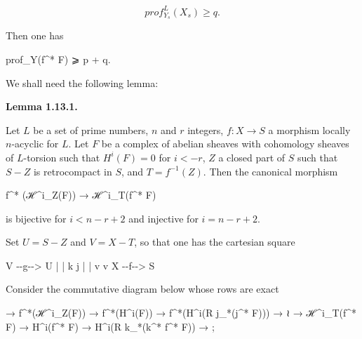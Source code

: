 \documentclass[
  11pt,
  a4paper,
]{book}
\newenvironment{Shaded}{}{}
\newcommand{\NormalTok}[1]{#1}
\begin{document}
\[ prof^{L}_{Y_{s}}(X_{s}) \geqslant q. \]

Then one has

\begin{Shaded}
\begin{Highlighting}[]
\NormalTok{prof\_Y(f\^{}* F) ⩾ p + q.}
\end{Highlighting}
\end{Shaded}

We shall need the following lemma:

\textbf{Lemma 1.13.1.}

Let \(L\) be a set of prime numbers, \(n\) and \(r\) integers,
\(f : X \to S\) a morphism locally \(n\)-acyclic for \(L\). Let \(F\) be
a complex of abelian sheaves with cohomology sheaves of \(L\)-torsion
such that \(H^{i}(F) = 0\) for \(i < -r\), \(Z\) a closed part of \(S\)
such that \(S - Z\) is retrocompact in \(S\), and \(T = f^{-1}(Z)\).
Then the canonical morphism

\begin{Shaded}
\begin{Highlighting}[]
\NormalTok{f\^{}* (ℋ\^{}i\_Z(F)) → ℋ\^{}i\_T(f\^{}* F)}
\end{Highlighting}
\end{Shaded}

is bijective for \(i < n - r + 2\) and injective for \(i = n - r + 2\).

Set \(U = S - Z\) and \(V = X - T\), so that one has the cartesian
square

\begin{Shaded}
\begin{Highlighting}[]
\NormalTok{V {-}{-}g{-}{-}\textgreater{} U}
\NormalTok{|        |}
\NormalTok{k        j}
\NormalTok{|        |}
\NormalTok{v        v}
\NormalTok{X {-}{-}f{-}{-}\textgreater{} S}
\end{Highlighting}
\end{Shaded}

Consider the commutative diagram below whose rows are exact

\begin{Shaded}
\begin{Highlighting}[]
\NormalTok{→ f\^{}*(ℋ\^{}i\_Z(F))    → f\^{}*(H\^{}i(F))    → f\^{}*(H\^{}i(R j\_*(j\^{}* F)))    →}
\NormalTok{                       ≀}
\NormalTok{→ ℋ\^{}i\_T(f\^{}* F)     → H\^{}i(f\^{}* F)     → H\^{}i(R k\_*(k\^{}* f\^{}* F))     → ;}
\end{Highlighting}
\end{Shaded}
\end{document}
